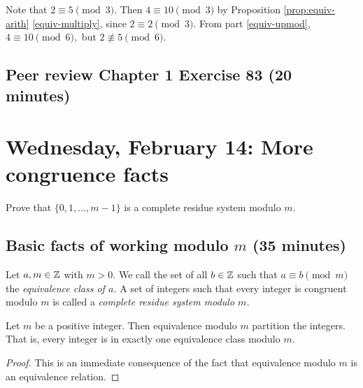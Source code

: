 \documentclass[letterpaper, 11 pt]{ximera}
\begin{document}
\begin{example}
Note that $2\equiv 5 \pmod 3$. Then $4\equiv 10 \pmod 3$ by Proposition \autoref{prop:equiv-arith} \ref{equiv-multiply}, since $2\equiv 2\pmod 3.$ From part \ref{equiv-upmod}, $4\equiv 10 \pmod 6,$ but $2\not\equiv 5\pmod 6.$ 
\end{example}


\subsection{Peer review Chapter 1 Exercise 83 (20 minutes)}

\section{Wednesday, February 14: More congruence facts}

\begin{obj}
 \item Prove that $\{0,1,\dots,m-1\}$ is a complete residue system modulo $m$.
\end{obj}

\subsection{Basic facts of working modulo $m$ (35 minutes)}

\begin{defn}\label{defn:complete-residue}
 Let $a,m\in\mathbb Z$ with $m>0$. We call the set of all $b\in\mathbb Z$ such that $a\equiv b \pmod{m}$ the \emph{equivalence class of $a$.} A set of integers such that every integer is congruent modulo $m$ is called a \emph{complete residue system modulo $m$.}
\end{defn}

\begin{prop*}\label{cor:mod-partition}
 Let $m$ be a positive integer. Then equivalence modulo $m$ partition the integers. That is, every integer is in exactly one equivalence class modulo $m$.
\end{prop*}
\begin{proof}
This is an immediate consequence of the fact that equivalence modulo $m$ is an equivalence relation.
\end{proof}
 
\end{document}

